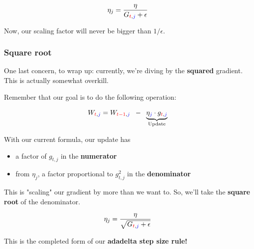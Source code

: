                 \begin{equation}
                    \eta_j = \frac{\eta}{G_{\textcolor{red}{t},\textcolor{blue}{j}}+\epsilon}
                \end{equation}

            Now, our scaling factor will never be bigger than $1/\epsilon$.

        \phantom{}

        \subsubsection{Square root}

            One last concern, to wrap up: currently, we're diving by the \textbf{squared} gradient. This is actually somewhat overkill. 
            
            Remember that our goal is to do the following operation:

            \begin{equation}
                W_{\textcolor{red}{t},\textcolor{blue}{j}} = W_{\textcolor{red}{t-1},\textcolor{blue}{j}}  \;\;-\;\; 
                \underbrace{
                    \eta_{\textcolor{blue}{j}} \cdot g_{\textcolor{red}{t},\textcolor{blue}{j}}
                }_{\text{Update}}
            \end{equation}

            With our current formula, our update has 
            
            \begin{itemize}
                \item a factor of $g_{t,j}$ in the \textbf{numerator}
                \item from $\eta_j$, a factor proportional to $g_{t,j}^2$ in the \textbf{denominator} 
            \end{itemize}

            This is "scaling" our gradient by more than we want to. So, we'll take the \textbf{square root} of the denominator.

            \begin{equation}
                \eta_j = \frac{\eta}{ \sqrt{G_{\textcolor{red}{t},\textcolor{blue}{j}}+\epsilon} }
            \end{equation}

            This is the completed form of our \textbf{adadelta step size rule!}\\

